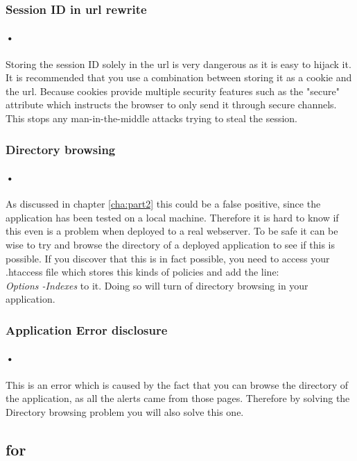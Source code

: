 \documentclass[11pt,english,a4paper]{report}
\begin{document}
\subsubsection{Session ID in \gls{url} rewrite}
\label{subsec:sessionid}
\paragraph{•}
Storing the session ID solely in the \gls{url} is very dangerous as it is easy to hijack it.
It is recommended that you use a combination between storing it as a cookie and the \gls{url}.
Because cookies provide multiple security features such as the "secure" attribute which instructs the browser to only send it through secure channels.
This stops any man-in-the-middle attacks trying to steal the session.\cite{session-management}

\subsubsection{Directory browsing}
\paragraph{•}
As discussed in chapter \ref{cha:part2} this could be a false positive, since the application has been tested on a local machine.
Therefore it is hard to know if this even is a problem when deployed to a real webserver. 
To be safe it can be wise to try and browse the directory of a deployed application to see if this is possible.
If you discover that this is in fact possible, you need to access your .htaccess file which stores this kinds of policies and add the line:
\\
\textit{Options -Indexes} to it.
Doing so will turn of directory browsing in your application.

\subsubsection{Application Error disclosure}
\paragraph{•}
This is an error which is caused by the fact that you can browse the directory of the application, as all the alerts came from those pages.
Therefore by solving the Directory browsing problem you will also solve this one.

\subsection{\gls{for}}
\end{document}
